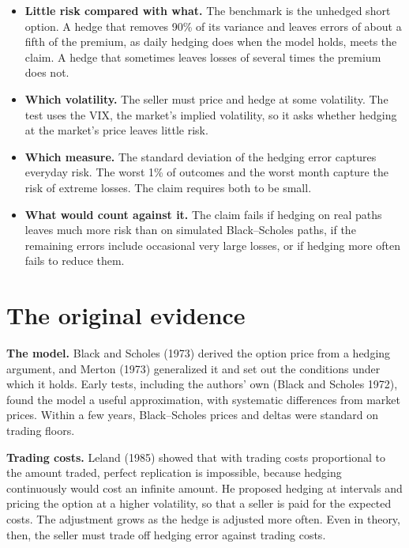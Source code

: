 \begin{itemize}
  \item \textbf{Little risk compared with what.} The benchmark is the unhedged short option. A hedge that removes 90\% of its variance and leaves errors of about a fifth of the premium, as daily hedging does when the model holds, meets the claim. A hedge that sometimes leaves losses of several times the premium does not.
  \item \textbf{Which volatility.} The seller must price and hedge at some volatility. The test uses the VIX, the market's implied volatility, so it asks whether hedging at the market's price leaves little risk.
  \item \textbf{Which measure.} The standard deviation of the hedging error captures everyday risk. The worst 1\% of outcomes and the worst month capture the risk of extreme losses. The claim requires both to be small.
  \item \textbf{What would count against it.} The claim fails if hedging on real paths leaves much more risk than on simulated Black--Scholes paths, if the remaining errors include occasional very large losses, or if hedging more often fails to reduce them.
\end{itemize}

\section{The original evidence}
\label{sec:14-evidence}

\textbf{The model.} Black and Scholes (1973) derived the option price from a hedging argument, and Merton (1973) generalized it and set out the conditions under which it holds. Early tests, including the authors' own (Black and Scholes 1972), found the model a useful approximation, with systematic differences from market prices. Within a few years, Black--Scholes prices and deltas were standard on trading floors.

\textbf{Trading costs.} Leland (1985) showed that with trading costs proportional to the amount traded, perfect replication is impossible, because hedging continuously would cost an infinite amount. He proposed hedging at intervals and pricing the option at a higher volatility, so that a seller is paid for the expected costs. The adjustment grows as the hedge is adjusted more often. Even in theory, then, the seller must trade off hedging error against trading costs.

